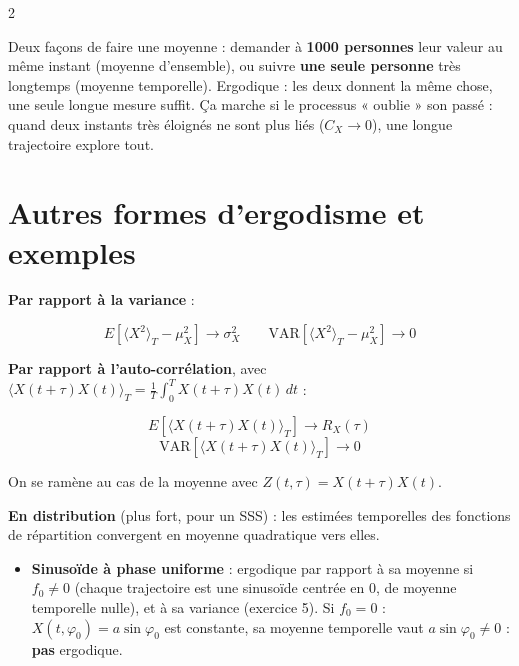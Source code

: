 \documentclass[a4paper,9pt]{extarticle}
\begin{document}
\begin{multicols}{2}
\begin{important}
\end{important}


\begin{simple}

Deux façons de faire une moyenne : demander à \textbf{1000 personnes} leur valeur au même
instant (moyenne d'ensemble), ou suivre \textbf{une seule personne} très longtemps (moyenne
temporelle). Ergodique : les deux donnent la même chose, une seule longue mesure suffit. Ça
marche si le processus « oublie » son passé : quand deux instants très éloignés ne sont plus
liés ($C_X\to0$), une longue trajectoire explore tout.

\end{simple}


\section{Autres formes d'ergodisme et exemples}


\begin{definition}

\textbf{Par rapport à la variance} :

\[
E[\langle X^2\rangle_T - \mu_X^2]\to\sigma_X^2 \qquad \mathrm{VAR}[\langle X^2\rangle_T -
\mu_X^2]\to0
\]

\textbf{Par rapport à l'auto-corrélation}, avec $\langle X(t+\tau)X(t)\rangle_T = \frac1T
\int_0^TX(t+\tau)X(t)\,dt$ :

\[
E[\langle X(t+\tau)X(t)\rangle_T] \to R_X(\tau)
\]
\[
\mathrm{VAR}[\langle X(t+\tau)X(t)\rangle_T]\to0
\]

On se ramène au cas de la moyenne avec $Z(t,\tau) = X(t+\tau)X(t)$.

\vspace{3pt}

\textbf{En distribution} (plus fort, pour un SSS) : les estimées temporelles des fonctions de
répartition convergent en moyenne quadratique vers elles.

\end{definition}


\begin{example}

\begin{itemize}

\item \textbf{Sinusoïde à phase uniforme} : ergodique par rapport à sa moyenne si $f_0 \ne 0$
(chaque trajectoire est une sinusoïde centrée en 0, de moyenne temporelle nulle), et à sa
variance (exercice 5). Si $f_0 = 0$ : $X(t,\varphi_0) = a\sin\varphi_0$ est constante, sa
moyenne temporelle vaut $a\sin\varphi_0 \ne 0$ : \textbf{pas} ergodique.


\end{itemize}
\end{example}
\end{multicols}
\end{document}
